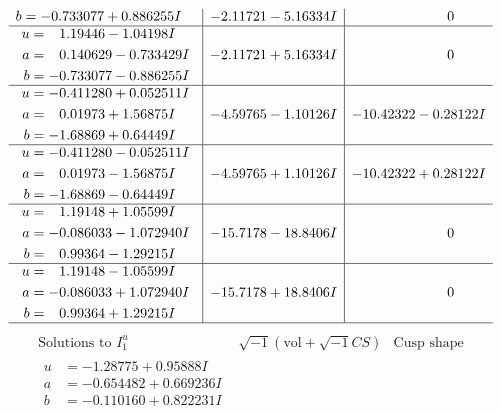 \documentclass[1p]{elsarticle_modified}
\theoremstyle{definition}
\newcommand{\I}{\sqrt{-1}}
\begin{document}
$$\begin{array}{c|c|c}
\begin{aligned}
b &= -0.733077 + 0.886255 I\end{aligned}
 & -2.11721 - 5.16334 I & \phantom{-0.000000 } 0 \\ \hline\begin{aligned}
u &= \phantom{-}1.19446 - 1.04198 I \\
a &= \phantom{-}0.140629 - 0.733429 I \\
b &= -0.733077 - 0.886255 I\end{aligned}
 & -2.11721 + 5.16334 I & \phantom{-0.000000 } 0 \\ \hline\begin{aligned}
u &= -0.411280 + 0.052511 I \\
a &= \phantom{-}0.01973 + 1.56875 I \\
b &= -1.68869 + 0.64449 I\end{aligned}
 & -4.59765 - 1.10126 I & -10.42322 - 0.28122 I \\ \hline\begin{aligned}
u &= -0.411280 - 0.052511 I \\
a &= \phantom{-}0.01973 - 1.56875 I \\
b &= -1.68869 - 0.64449 I\end{aligned}
 & -4.59765 + 1.10126 I & -10.42322 + 0.28122 I \\ \hline\begin{aligned}
u &= \phantom{-}1.19148 + 1.05599 I \\
a &= -0.086033 - 1.072940 I \\
b &= \phantom{-}0.99364 - 1.29215 I\end{aligned}
 & -15.7178 - 18.8406 I & \phantom{-0.000000 } 0 \\ \hline\begin{aligned}
u &= \phantom{-}1.19148 - 1.05599 I \\
a &= -0.086033 + 1.072940 I \\
b &= \phantom{-}0.99364 + 1.29215 I\end{aligned}
 & -15.7178 + 18.8406 I & \phantom{-0.000000 } 0\\
 \hline 
 \end{array}$$\newpage$$\begin{array}{c|c|c}  
\text{Solutions to }I^u_{1}& \I (\text{vol} + \sqrt{-1}CS) & \text{Cusp shape}\\
 \hline 
\begin{aligned}
u &= -1.28775 + 0.95888 I \\
a &= -0.654482 + 0.669236 I \\
b &= -0.110160 + 0.822231 I\end{aligned}

\end{array}$$
\end{document}
